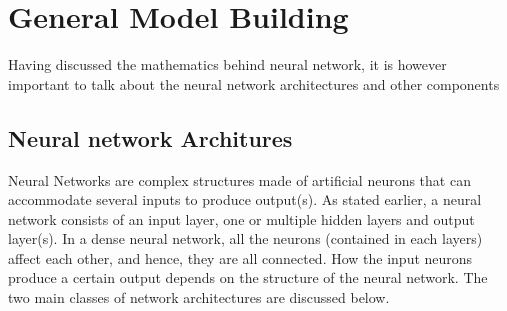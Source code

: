 \documentclass[a4paper,11pt,oneside]{book}
\begin{document}
 \section{General Model Building}
 Having discussed the mathematics behind neural network, it is however important to talk about the neural network architectures and other components
 \subsection{Neural network Architures}
 Neural Networks are complex structures made of artificial neurons that can accommodate several inputs to produce output(s). As stated earlier, a neural network consists of an input layer, one or multiple hidden layers and output layer(s). In a dense neural network, all the neurons (contained in each layers) affect each other, and hence, they are all connected. How the input neurons produce a certain output depends
 on the structure of the neural network. The two main classes of network architectures are discussed below.
\end{document}
